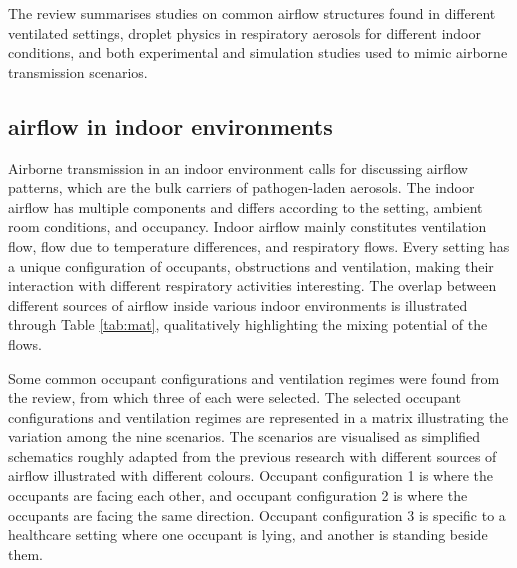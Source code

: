 \documentclass[a4paper,12pt]{elsarticle}
\begin{document}
The review summarises studies on common airflow structures found in different ventilated settings, droplet physics in respiratory aerosols for different indoor conditions, and both experimental and simulation studies used to mimic airborne transmission scenarios.

\subsection{airflow in indoor environments}

Airborne transmission in an indoor environment calls for discussing airflow patterns, which are the bulk carriers of pathogen-laden aerosols. The indoor airflow has multiple components and differs according to the setting, ambient room conditions, and occupancy. Indoor airflow mainly constitutes ventilation flow, flow due to temperature differences, and respiratory flows. Every setting has a unique configuration of occupants, obstructions and ventilation, making their interaction with different respiratory activities interesting. The overlap between different sources of airflow inside various indoor environments is illustrated through Table \ref{tab:mat}, qualitatively highlighting the mixing potential of the flows.

Some common occupant configurations and ventilation regimes were found from the review, from which three of each were selected. The selected occupant configurations and ventilation regimes are represented in a matrix illustrating the variation among the nine scenarios. The scenarios are visualised as simplified schematics roughly adapted from the previous research with different sources of airflow illustrated with different colours. Occupant configuration 1 is where the occupants are facing each other, and occupant configuration 2 is where the occupants are facing the same direction. Occupant configuration 3 is specific to a healthcare setting where one occupant is lying, and another is standing beside them.
\end{document}
